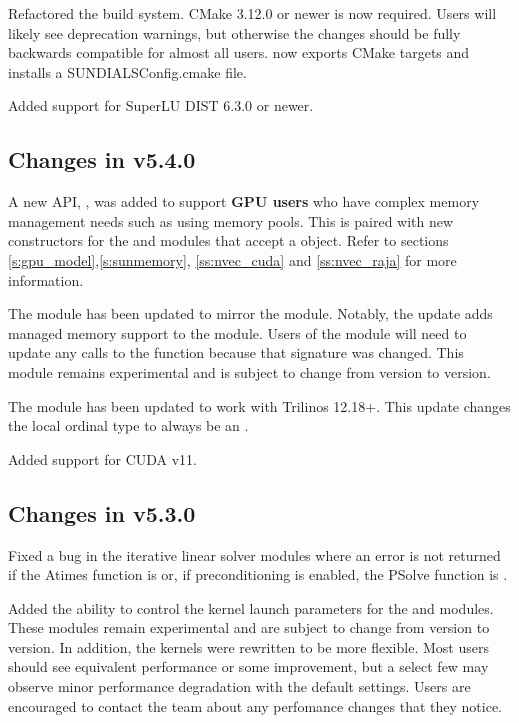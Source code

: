 Refactored the {\sundials} build system. CMake 3.12.0 or newer is now required.
Users will likely see deprecation warnings, but otherwise the changes
should be fully backwards compatible for almost all users. {\sundials}
now exports CMake targets and installs a SUNDIALSConfig.cmake file.

Added support for SuperLU DIST 6.3.0 or newer.


\subsection*{Changes in v5.4.0}

A new API, , was added to support \textbf{GPU users} who
have complex memory management needs such as using memory pools. This is paired
with new constructors for the {\nveccuda} and {\nvecraja} modules that accept a
 object. Refer to sections
\ref{s:gpu_model},\ref{s:sunmemory}, \ref{ss:nvec_cuda} and \ref{ss:nvec_raja}
for more information.

The  module has been updated to mirror the  module.
Notably, the update adds managed memory support to the  module.
Users of the module will need to update any calls to the  function
because that signature was changed. This module remains experimental and is
subject to change from version to version.

The  module has been updated to work with Trilinos 12.18+.
This update changes the local ordinal type to always be an .

Added support for CUDA v11.


\subsection*{Changes in v5.3.0}

Fixed a bug in the iterative linear solver modules where an error is not
returned if the Atimes function is  or, if preconditioning is enabled,
the PSolve function is .

Added the ability to control the {\cuda} kernel launch parameters for the
 and  modules. These modules remain
experimental and are subject to change from version to version.
In addition, the  kernels were rewritten to be more flexible.
Most users should see equivalent performance or some improvement, but a select
few may observe minor performance degradation with the default settings. Users
are encouraged to contact the {\sundials} team about any perfomance changes
that they notice.

